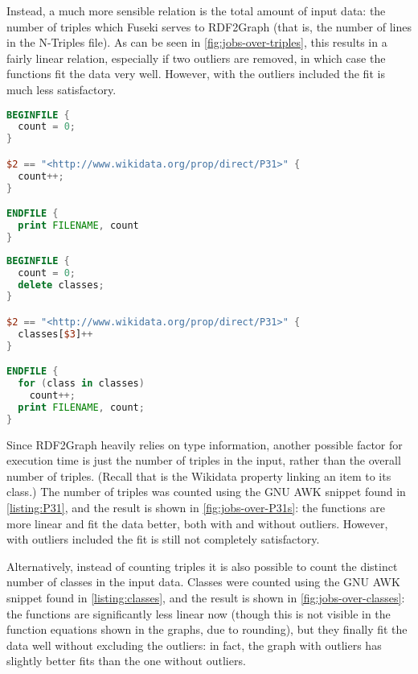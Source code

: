 Instead, a much more sensible relation is the total amount of input data:
the number of \glspl{triple} which Fuseki serves to \gls{RDF2Graph}
(that is, the number of lines in the \gls{N-Triples} file).
As can be seen in \cref{fig:jobs-over-triples},
this results in a fairly linear relation,
especially if two outliers are removed,
in which case the functions fit the data very well.
However, with the outliers included the fit is much less satisfactory.

\begin{lstfloat}[b]
\begin{lstlisting}[language=awk]
BEGINFILE {
  count = 0;
}

$2 == "<http://www.wikidata.org/prop/direct/P31>" {
  count++;
}

ENDFILE {
  print FILENAME, count
}
\end{lstlisting}
\caption{GNU AWK script to count the number of  triples in the input.}
\label{listing:P31}
\end{lstfloat}

\begin{lstfloat}[b]
\begin{lstlisting}[language=awk]
BEGINFILE {
  count = 0;
  delete classes;
}

$2 == "<http://www.wikidata.org/prop/direct/P31>" {
  classes[$3]++
}

ENDFILE {
  for (class in classes)
    count++;
  print FILENAME, count;
}
\end{lstlisting}
\caption{GNU AWK script to count distinct classes in the input.}
\label{listing:classes}
\end{lstfloat}

Since \gls{RDF2Graph} heavily relies on type information,
another possible factor for execution time
is just the number of  \glspl{triple} in the input,
rather than the overall number of \glspl{triple}.
(Recall that  is the \gls{Wikidata} property linking an \gls{item} to its class.)
The number of  \glspl{triple} was counted
using the GNU AWK snippet found in \cref{listing:P31},
and the result is shown in \cref{fig:jobs-over-P31s}:
the functions are more linear and fit the data better, both with and without outliers.
However, with outliers included the fit is still not completely satisfactory.

Alternatively, instead of counting  \glspl{triple}
it is also possible to count the distinct number of classes in the input data.
Classes were counted using the GNU AWK snippet found in \cref{listing:classes},
and the result is shown in \cref{fig:jobs-over-classes}:
the functions are significantly less linear now
(though this is not visible in the function equations shown in the graphs, due to rounding),
but they finally fit the data well without excluding the outliers:
in fact, the graph with outliers has slightly better fits than the one without outliers.

